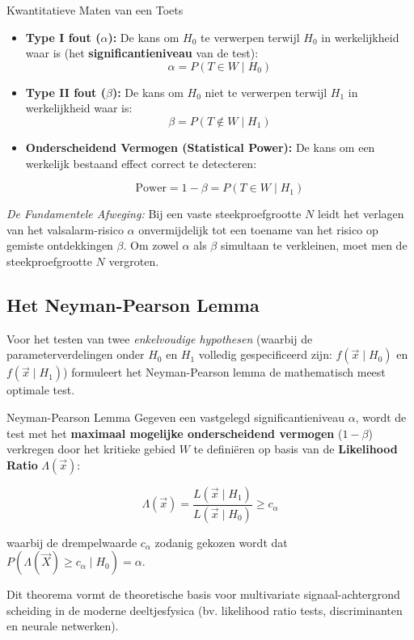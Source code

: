 \documentclass[11pt,a4paper]{article}
\begin{document}
\begin{defbox}{Kwantitatieve Maten van een Toets}
\begin{itemize}[leftmargin=1.2em]
    \item \textbf{Type I fout ($\alpha$):} De kans om $H_0$ te verwerpen terwijl $H_0$ in werkelijkheid waar is (het \textbf{significantieniveau} van de test):
    \begin{equation}
        \alpha = P(T \in W \mid H_0)
    \end{equation}
    \item \textbf{Type II fout ($\beta$):} De kans om $H_0$ niet te verwerpen terwijl $H_1$ in werkelijkheid waar is:
    \begin{equation}
        \beta = P(T \notin W \mid H_1)
    \end{equation}
    \item \textbf{Onderscheidend Vermogen (Statistical Power):} De kans om een werkelijk bestaand effect correct te detecteren:
    \begin{formulabox}
    \begin{equation}
        \text{Power} = 1 - \beta = P(T \in W \mid H_1)
    \end{equation}
    \end{formulabox}
\end{itemize}
\end{defbox}

\emph{De Fundamentele Afweging:} Bij een vaste steekproefgrootte $N$ leidt het verlagen van het valsalarm-risico $\alpha$ onvermijdelijk tot een toename van het risico op gemiste ontdekkingen $\beta$. Om zowel $\alpha$ als $\beta$ simultaan te verkleinen, moet men de steekproefgrootte $N$ vergroten.

\subsection{Het Neyman-Pearson Lemma}
Voor het testen van twee \emph{enkelvoudige hypothesen} (waarbij de parameterverdelingen onder $H_0$ en $H_1$ volledig gespecificeerd zijn: $f(\vec{x} \mid H_0)$ en $f(\vec{x} \mid H_1)$) formuleert het Neyman-Pearson lemma de mathematisch meest optimale test.

\begin{theobox}{Neyman-Pearson Lemma}
Gegeven een vastgelegd significantieniveau $\alpha$, wordt de test met het \textbf{maximaal mogelijke onderscheidend vermogen} ($1 - \beta$) verkregen door het kritieke gebied $W$ te definiëren op basis van de \textbf{Likelihood Ratio} $\Lambda(\vec{x})$:
\begin{formulabox}
\begin{equation}
    \Lambda(\vec{x}) = \frac{L(\vec{x} \mid H_1)}{L(\vec{x} \mid H_0)} \ge c_\alpha
\end{equation}
\end{formulabox}
waarbij de drempelwaarde $c_\alpha$ zodanig gekozen wordt dat $P(\Lambda(\vec{X}) \ge c_\alpha \mid H_0) = \alpha$.
\end{theobox}
Dit theorema vormt de theoretische basis voor multivariate signaal-achtergrond scheiding in de moderne deeltjesfysica (bv. likelihood ratio tests, discriminanten en neurale netwerken).
\end{document}
